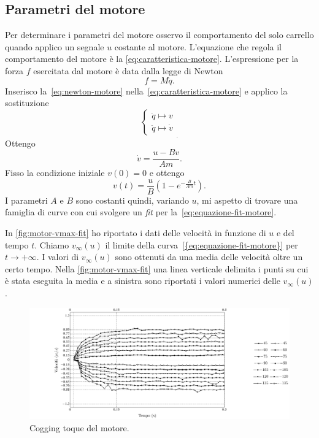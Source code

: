 \subsection{Parametri del motore}
\label{subsec:parametri-motore}
Per determinare i parametri del motore osservo il comportamento del solo
carrello quando applico un segnale $u$ costante al motore.
L'equazione che regola il comportamento del motore è la \eqref{eq:caratteristica-motore}.
L'espressione per la forza $f$
esercitata dal motore è data dalla legge di Newton
\begin{equation}
    f = M \ddot q.
    \label{eq:newton-motore}
\end{equation}
Inserisco la~\eqref{eq:newton-motore} nella~\eqref{eq:caratteristica-motore}
e applico la sostituzione
\begin{equation*}
    \left\{
    \begin{aligned}
        \dot q \mapsto v \\
        \ddot q \mapsto \dot v
    \end{aligned}
    \right.
    _.
    \label{eq:sostituzione-motore}
\end{equation*}
Ottengo
\begin{equation*}
    \dot v = \frac{u - B v} {Am}.
\end{equation*}
Fisso la condizione iniziale $v(0) = 0$ e ottengo
\begin{equation}
    v(t) = \frac u B \left(1 - e^{-\frac B {Am} t}\right).
    \label{eq:equazione-fit-motore}
\end{equation}
I parametri $A$ e $B$ sono costanti quindi, variando $u$, mi aspetto di trovare
una famiglia di curve con cui svolgere un \emph{fit} per la~\eqref{eq:equazione-fit-motore}.

In \autoref{fig:motor-vmax-fit} ho riportato i dati delle velocità in funzione di
$u$ e del tempo $t$. Chiamo $v_\infty(u)$ il limite della
curva~\eqref{{eq:equazione-fit-motore}} per $t \to +\infty$. I valori di
$v_\infty(u)$ sono ottenuti da una media delle velocità oltre un certo tempo.
Nella \autoref{fig:motor-vmax-fit} una linea verticale delimita i punti su cui è
stata eseguita la media e a sinistra sono riportati i valori numerici delle $v_\infty(u)$.

\begin{figure}[H]
    \centering
    \includegraphics[width=\textwidth]{docs/report/assets/motor-vmax-fit}
    \caption[Cogging torque]{Cogging toque del motore.}
    \label{fig:motor-vmax-fit}
\end{figure}

